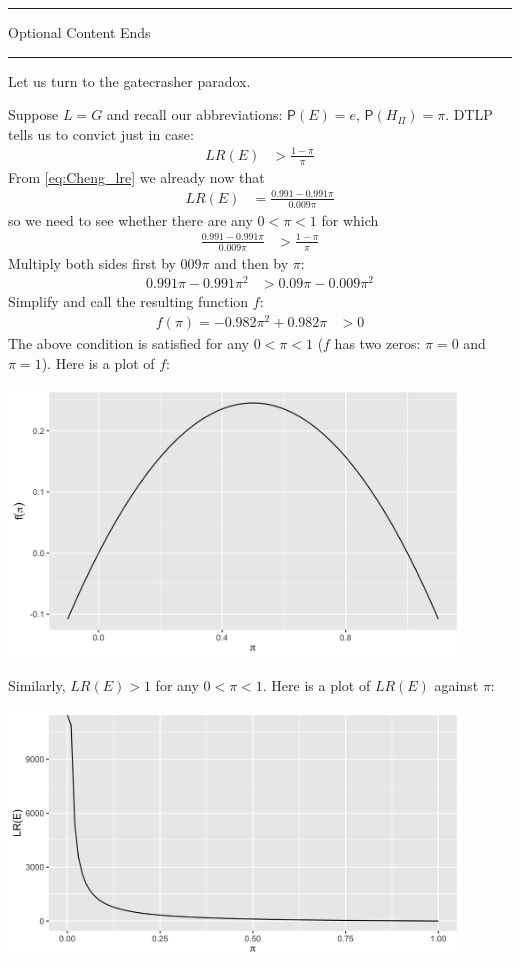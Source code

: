 \documentclass[10pt,dvipsnames,enabledeprecatedfontcommands]{scrartcl}
\newcommand{\pr}[1]{\mathsf{P}(#1)}
\newcommand{\intermezzob}{\nopagebreak 
	\begin{minipage}[c]{13cm}
	\begin{center}\rule{10cm}{0.4pt}

	\tiny{\sc Optional Content Ends}
	
	\vspace{-1mm}
	
	\rule{10cm}{0.4pt}\end{center}
	\end{minipage}
	}
\begin{document}
\intermezzob

Let us turn to the gatecrasher paradox.

Suppose \(L=G\) and recall our abbreviations: \(\pr{E}=e\),
\(\pr{H_\Pi}=\pi\). DTLP tells us to convict just in case:
\begin{align*}
 LR(E) &> \frac{1-\pi}{\pi}
 \end{align*} \noindent From \eqref{eq:Cheng_lre} we already now that
\begin{align*}
 LR(E) & = \frac{0.991-0.991\pi}{0.009\pi}
 \end{align*} \noindent so we need to see whether there are any
\(0<\pi<1\) for which\\
\begin{align*}
  \frac{0.991-0.991\pi}{0.009\pi} &> \frac{1-\pi}{\pi}
 \end{align*} \noindent Multiply both sides first by \(009\pi\) and then
by \(\pi\): \begin{align*}
 0.991\pi - 0.991\pi^2 &> 0.09\pi - 0.009\pi^2
 \end{align*} \noindent Simplify and call the resulting function \(f\):
\begin{align*}
 f(\pi) = - 0.982 \pi^2 + 0.982\pi &>0 
 \end{align*} \noindent The above condition is satisfied for any
\(0<\pi <1\) (\(f\) has two zeros: \(\pi = 0\) and \(\pi = 1\)). Here is
a plot of \(f\):

\includegraphics[width=12cm]{f-gate.png}

Similarly, \(LR(E)>1\) for any \(0< \pi <1\). Here is a plot of
\(LR(E)\) against \(\pi\):

\includegraphics[width=12cm]{lre-gate.png}
\end{document}
